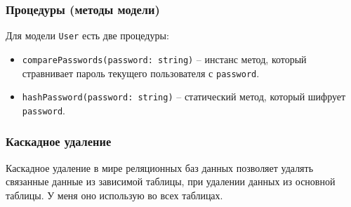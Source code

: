\subsubsection{Процедуры (методы модели)}
Для модели \texttt{User} есть две процедуры:
\begin{itemize}
    \item \texttt{comparePasswords(password: string)} -- инстанс метод, который стравнивает пароль текущего пользователя с \texttt{password}.
    \item \texttt{hashPassword(password: string)} -- статический метод, который шифрует \texttt{password}.
\end{itemize}

\subsubsection{Каскадное удаление}
Каскадное удаление в мире реляционных баз данных позволяет удалять связанные данные из зависимой таблицы, при удалении данных из основной таблицы. У меня оно использую во всех таблицах.

\clearpage